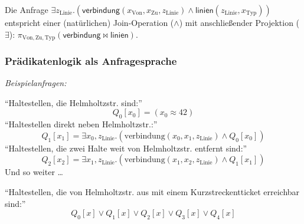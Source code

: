 \documentclass[aspectratio=1610,onlymath]{beamer}
\begin{document}
\begin{frame}
Die Anfrage \alert{$\exists z_{\text{Linie}}.(\textsf{verbindung}(x_\text{Von},x_\text{Zu}, z_{\text{Linie}})\wedge \textsf{linien}(z_{\text{Linie}},x_{\text{Typ}}))$}
entspricht einer (natürlichen) Join-Operation ($\wedge$) mit anschließender Projektion ($\exists$):
\alert{$\pi_{\text{Von},\text{Zu},\text{Typ}}(\textsf{verbindung}\bowtie\textsf{linien})$}.

\end{frame}

\begin{frame}\frametitle{Prädikatenlogik als Anfragesprache}

\emph{Beispielanfragen:}\medskip

\alert{``Haltestellen, die Helmholtzstr. sind:''}
%
\[ Q_0[x_0] = (x_0\approx 42) \]\pause
%
\alert{``Haltestellen direkt neben Helmholtzstr.:''}
\[
   Q_1[x_1] = \exists x_0,z_\text{Linie}.(\text{verbindung}(x_0,x_1,z_\text{Linie})\wedge Q_0[x_0])
\]\pause
\alert{``Haltestellen, die zwei Halte weit von Helmholtzstr. entfernt sind:''}
\[
   Q_2[x_2] = \exists x_1,z_\text{Linie}.(\text{verbindung}(x_1,x_2,z_\text{Linie})\wedge Q_1[x_1])
\]\pause
Und so weiter \ldots\bigskip
% 

\alert{``Haltestellen, die von Helmholtzstr. aus mit einem Kurzstreckentticket erreichbar sind:''}
\[
	Q_0[x]\vee Q_1[x]\vee Q_2[x]\vee Q_3[x]\vee Q_4[x]
\]
% 
% 
\end{frame}
\end{document}
